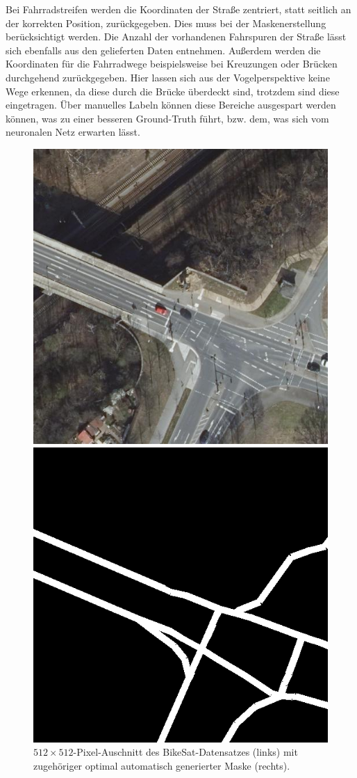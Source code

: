 Bei Fahrradstreifen werden die Koordinaten der Straße zentriert, statt seitlich an der korrekten Position, zurückgegeben.
Dies muss bei der Maskenerstellung berücksichtigt werden. Die Anzahl der vorhandenen Fahrspuren der Straße lässt sich ebenfalls aus den gelieferten Daten entnehmen.
Außerdem werden die Koordinaten für die Fahrradwege beispielsweise bei Kreuzungen oder Brücken durchgehend zurückgegeben. 
Hier lassen sich aus der Vogelperspektive keine Wege erkennen, da diese durch die Brücke überdeckt sind, trotzdem sind diese eingetragen.
Über manuelles Labeln können diese Bereiche ausgespart werden können, was zu einer besseren Ground-Truth führt, bzw. dem, was sich vom neuronalen Netz erwarten lässt.

\begin{figure}
	\centering
	\begin{minipage}{.45\textwidth}
		\centering
		\includegraphics[width=.7\linewidth]{Bilder/good-cut-ex.png} 
	\end{minipage}
	\begin{minipage}{.45\textwidth}
		\centering
		\includegraphics[width=.7\linewidth]{Bilder/good-cut-ex-mask.png} 
	\end{minipage}

	\caption{$512{\times}512$-Pixel-Auschnitt des BikeSat-Datensatzes (links) 
	mit zugehöriger optimal automatisch generierter Maske (rechts).}
	\label{fig:good-mask}
\end{figure} 

